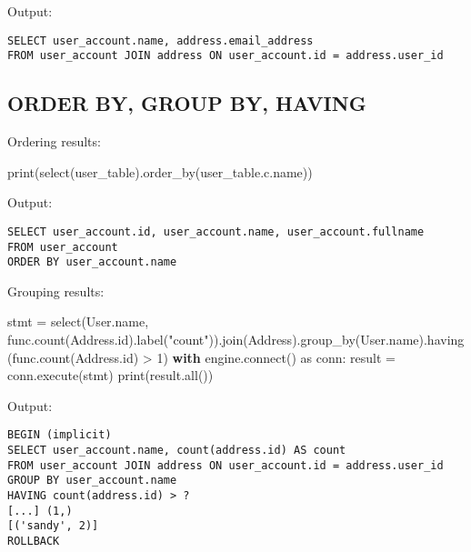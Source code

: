 \documentclass[
  letterpaper,
  DIV=11,
  numbers=noendperiod]{scrreprt}
\newenvironment{Shaded}{\begin{snugshade}}{\end{snugshade}}
\newcommand{\BuiltInTok}[1]{\textcolor[rgb]{0.00,0.23,0.31}{#1}}
\newcommand{\ControlFlowTok}[1]{\textcolor[rgb]{0.00,0.23,0.31}{\textbf{#1}}}
\newcommand{\DecValTok}[1]{\textcolor[rgb]{0.68,0.00,0.00}{#1}}
\newcommand{\ExtensionTok}[1]{\textcolor[rgb]{0.00,0.23,0.31}{#1}}
\newcommand{\ImportTok}[1]{\textcolor[rgb]{0.00,0.46,0.62}{#1}}
\newcommand{\NormalTok}[1]{\textcolor[rgb]{0.00,0.23,0.31}{#1}}
\newcommand{\OperatorTok}[1]{\textcolor[rgb]{0.37,0.37,0.37}{#1}}
\newcommand{\StringTok}[1]{\textcolor[rgb]{0.13,0.47,0.30}{#1}}
\begin{document}
Output:

\begin{verbatim}
SELECT user_account.name, address.email_address
FROM user_account JOIN address ON user_account.id = address.user_id
\end{verbatim}

\subsection{ORDER BY, GROUP BY, HAVING}\label{order-by-group-by-having}

Ordering results:

\begin{Shaded}
\begin{Highlighting}[]
\BuiltInTok{print}\NormalTok{(select(user\_table).order\_by(user\_table.c.name))}
\end{Highlighting}
\end{Shaded}

Output:

\begin{verbatim}
SELECT user_account.id, user_account.name, user_account.fullname
FROM user_account
ORDER BY user_account.name
\end{verbatim}

Grouping results:

\begin{Shaded}
\begin{Highlighting}[]
\NormalTok{stmt }\OperatorTok{=}\NormalTok{ select(User.name, func.count(Address.}\BuiltInTok{id}\NormalTok{).label(}\StringTok{"count"}\NormalTok{)).join(Address).group\_by(User.name).having(func.count(Address.}\BuiltInTok{id}\NormalTok{) }\OperatorTok{\textgreater{}} \DecValTok{1}\NormalTok{)}
\ControlFlowTok{with}\NormalTok{ engine.}\ExtensionTok{connect}\NormalTok{() }\ImportTok{as}\NormalTok{ conn:}
\NormalTok{    result }\OperatorTok{=}\NormalTok{ conn.execute(stmt)}
    \BuiltInTok{print}\NormalTok{(result.}\BuiltInTok{all}\NormalTok{())}
\end{Highlighting}
\end{Shaded}

Output:

\begin{verbatim}
BEGIN (implicit)
SELECT user_account.name, count(address.id) AS count
FROM user_account JOIN address ON user_account.id = address.user_id GROUP BY user_account.name
HAVING count(address.id) > ?
[...] (1,)
[('sandy', 2)]
ROLLBACK
\end{verbatim}
\end{document}
